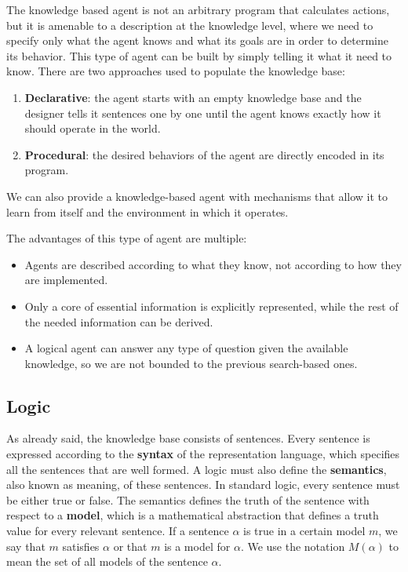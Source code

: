 \documentclass{article}
\begin{document}
The knowledge based agent is not an arbitrary program that calculates actions, but it is amenable to a description at the knowledge level, where we need to specify only what the agent knows and what its goals are in order to determine its behavior. This type of agent can be built by simply telling it what it need to know. There are two approaches used to populate the knowledge base:
\begin{enumerate}
    \item \textbf{Declarative}: the agent starts with an empty knowledge base and the designer tells it sentences one by one until the agent knows exactly how it should operate in the world.
    \item \textbf{Procedural}: the desired behaviors of the agent are directly encoded in its program.
\end{enumerate}
We can also provide a knowledge-based agent with mechanisms that allow it to learn from itself and the environment in which it operates.

The advantages of this type of agent are multiple:
\begin{itemize}
    \item Agents are described according to what they know, not according to how they are implemented.
    \item Only a core of essential information is explicitly represented, while the rest of the needed information can be derived.
    \item A logical agent can answer any type of question given the available knowledge, so we are not bounded to the previous search-based ones.
\end{itemize}

\subsection{Logic}
As already said, the knowledge base consists of sentences. Every sentence is expressed according to the \textbf{syntax} of the representation language, which specifies all the sentences that are well formed. A logic must also define the \textbf{semantics}, also known as meaning, of these sentences. In standard logic, every sentence must be either true or false. The semantics defines the truth of the sentence with respect to a \textbf{model}, which is a mathematical abstraction that defines a truth value for every relevant sentence.  If a sentence \(\alpha\) is true in a certain model \(m\), we say that \(m\) satisfies \(\alpha\) or that \(m\) is a model for \(\alpha\). We use the notation \(M(\alpha)\) to mean the set of all models of the sentence \(\alpha\).
\end{document}
